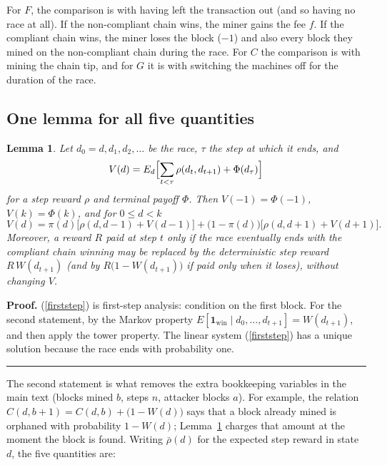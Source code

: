 \documentclass{article}%
\newtheorem{lemma}[theorem]{Lemma}
\newenvironment{proof}[1][Proof]{\noindent\textbf{#1.} }{\ \rule{0.5em}{0.5em}}
\begin{document}
\noindent For $F$, the comparison is with having left the transaction out
(and so having no race at all). If the non-compliant chain wins, the miner
gains the fee $f$. If the compliant chain wins, the miner loses the block
($-1$) and also every block they mined on the non-compliant chain during the
race. For $C$ the comparison is with mining the chain tip, and for $G$ it is
with switching the machines off for the duration of the race.

\subsection{One lemma for all five quantities}

\begin{lemma}
\label{lem:firststep}Let $d_{0}=d,d_{1},d_{2},\dots$ be the race, $\tau$ the
step at which it ends, and
\[
V(d)=E_{d}\Bigl[\sum_{t<\tau}\rho(d_{t},d_{t+1})+\Phi(d_{\tau})\Bigr]
\]
for a step reward $\rho$ and terminal payoff $\Phi$. Then $V(-1)=\Phi(-1)$,
$V(k)=\Phi(k)$, and for $0\leq d<k$%
\begin{equation}
V(d)=\pi(d)\bigl[\rho(d,d-1)+V(d-1)\bigr]+\bigl(1-\pi(d)\bigr)\bigl[\rho
(d,d+1)+V(d+1)\bigr]. \label{firststep}%
\end{equation}
Moreover, a reward $R$ paid at step $t$ \emph{only if the race eventually ends
with the compliant chain winning} may be replaced by the deterministic step
reward $R\,W(d_{t+1})$ (and by $R\bigl(1-W(d_{t+1})\bigr)$ if paid only when
it loses), without changing $V$.
\end{lemma}

\begin{proof}
(\ref{firststep}) is first-step analysis: condition on the first block. For
the second statement, by the Markov property $E[\mathbf{1}_{\text{win}}\mid
d_{0},\dots,d_{t+1}]=W(d_{t+1})$, and then apply the tower property. The linear
system (\ref{firststep}) has a unique solution because the race ends with
probability one.
\end{proof}

The second statement is what removes the extra bookkeeping variables in the
main text (blocks mined $b$, steps $n$, attacker blocks $a$). For example, the
relation $C(d,b+1)=C(d,b)+\bigl(1-W(d)\bigr)$ says that a block already mined
is orphaned with probability $1-W(d)$; Lemma~\ref{lem:firststep} charges that
amount at the moment the block is found. Writing $\bar{\rho}(d)$ for the
expected step reward in state $d$, the five quantities are:
\end{document}
